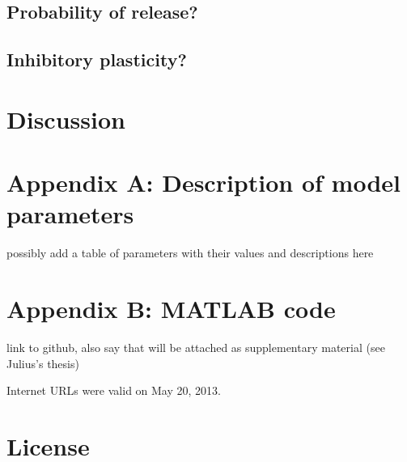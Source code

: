 \documentclass[a4paper,12pt]{report}
\theoremstyle{definition}
\begin{document}
\section{Probability of release?}

\section{Inhibitory plasticity?}


\chapter{Discussion}



\chapter*{Appendix A: Description of model parameters}

possibly add a table of parameters with their values and descriptions here

\chapter*{Appendix B: MATLAB code}

link to github, also say that will be attached as supplementary material (see Julius's thesis)





Internet URLs were valid on May 20, 2013.
\newpage



\chapter*{License}


%
%
\end{document}
